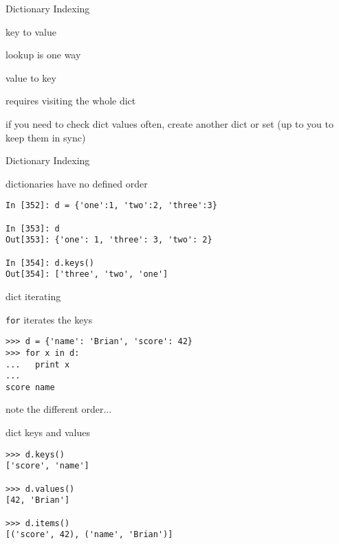 \documentclass{beamer}
\begin{document}
\begin{frame}[fragile]{Dictionary Indexing}

\vfill
{\Large
{\center 

key to value

lookup is one way

}}
\vfill
{\Large
{\center 

value to key

requires visiting the whole dict

}}

\vfill
{\Large
if you need to check dict values often, create another dict or set (up to you to keep them in sync)

}
\vfill
\end{frame} 

\begin{frame}[fragile]{Dictionary Indexing}

\vfill
{\Large
dictionaries have no defined order
}
\vfill
\begin{verbatim}
In [352]: d = {'one':1, 'two':2, 'three':3}

In [353]: d
Out[353]: {'one': 1, 'three': 3, 'two': 2}

In [354]: d.keys()
Out[354]: ['three', 'two', 'one']
\end{verbatim}
\vfill
\end{frame} 

\begin{frame}[fragile]{dict iterating}

{\Large \verb|for| iterates the keys}
\vfill
\begin{verbatim}
>>> d = {'name': 'Brian', 'score': 42}
>>> for x in d:
...   print x
...
score name
\end{verbatim}
\vfill
{note the different order...}
\end{frame}

\begin{frame}[fragile]{dict keys and values}

\vfill
\begin{verbatim}
>>> d.keys()
['score', 'name']

>>> d.values()
[42, 'Brian']

>>> d.items()
[('score', 42), ('name', 'Brian')]
\end{verbatim}
\vfill
\end{frame}
\end{document}
